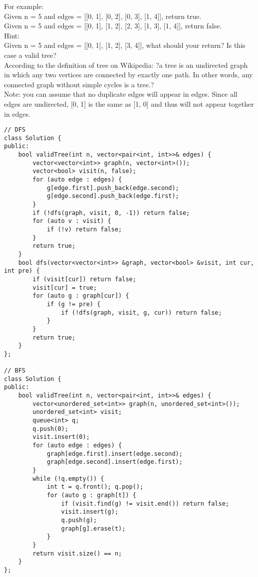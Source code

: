 For example:\\
Given n = 5 and edges = [[0, 1], [0, 2], [0, 3], [1, 4]], return true.\\
Given n = 5 and edges = [[0, 1], [1, 2], [2, 3], [1, 3], [1, 4]], return false.\\

Hint:\\
    Given n = 5 and edges = [[0, 1], [1, 2], [3, 4]], what should your return? Is this case a valid tree?\\
    According to the definition of tree on Wikipedia: ?a tree is an undirected graph in which any two vertices are connected by exactly one path. In other words, any connected graph without simple cycles is a tree.?\\

Note: you can assume that no duplicate edges will appear in edges. Since all edges are undirected, [0, 1] is the same as [1, 0] and thus will not appear together in edges.\\

\begin{lstlisting}
// DFS
class Solution {
public:
    bool validTree(int n, vector<pair<int, int>>& edges) {
        vector<vector<int>> graph(n, vector<int>());
        vector<bool> visit(n, false);
        for (auto edge : edges) {
            g[edge.first].push_back(edge.second);
            g[edge.second].push_back(edge.first);
        }
        if (!dfs(graph, visit, 0, -1)) return false;
        for (auto v : visit) {
            if (!v) return false;
        }
        return true;
    }
    bool dfs(vector<vector<int>> &graph, vector<bool> &visit, int cur, int pre) {
        if (visit[cur]) return false;
        visit[cur] = true;
        for (auto g : graph[cur]) {
            if (g != pre) {
                if (!dfs(graph, visit, g, cur)) return false;
            }
        }
        return true;
    }
};

// BFS
class Solution {
public:
    bool validTree(int n, vector<pair<int, int>>& edges) {
        vector<unordered_set<int>> graph(n, unordered_set<int>());
        unordered_set<int> visit;
        queue<int> q;
        q.push(0);
        visit.insert(0);
        for (auto edge : edges) {
            graph[edge.first].insert(edge.second);
            graph[edge.second].insert(edge.first);
        }
        while (!q.empty()) {
            int t = q.front(); q.pop();
            for (auto g : graph[t]) {
                if (visit.find(g) != visit.end()) return false;
                visit.insert(g);
                q.push(g);
                graph[g].erase(t);
            }
        }
        return visit.size() == n;
    }
};
\end{lstlisting}


